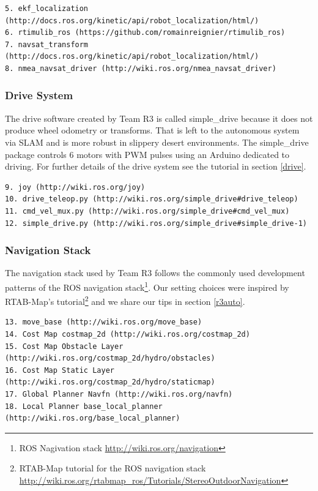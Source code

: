 \documentclass[runningheads,a4paper]{llncs}
\begin{document}
\begin{lstlisting}[frame=single,caption={Odometry software components used in Team R3's rover (numbers refer to Fig. \ref{fig:Diagram}).},basicstyle=\sffamily\scriptsize]
5. ekf_localization (http://docs.ros.org/kinetic/api/robot_localization/html/)
6. rtimulib_ros (https://github.com/romainreignier/rtimulib_ros)
7. navsat_transform (http://docs.ros.org/kinetic/api/robot_localization/html/)
8. nmea_navsat_driver (http://wiki.ros.org/nmea_navsat_driver)
\end{lstlisting}


\subsubsection*{Drive System}
The drive software created by Team R3 is called simple\_drive because it does not produce wheel odometry or transforms. That is left to the autonomous system via SLAM and is more robust in slippery desert environments. The simple\_drive package controls 6 motors with PWM pulses using an Arduino dedicated to driving. For further details of the drive system see the tutorial in section \ref{drive}.

\begin{lstlisting}[frame=single,caption={Drive system software used in Team R3's rover (numbers refer to Fig. \ref{fig:Diagram}).},basicstyle=\sffamily\scriptsize]
9. joy (http://wiki.ros.org/joy)
10. drive_teleop.py (http://wiki.ros.org/simple_drive#drive_teleop)
11. cmd_vel_mux.py (http://wiki.ros.org/simple_drive#cmd_vel_mux)
12. simple_drive.py (http://wiki.ros.org/simple_drive#simple_drive-1)
\end{lstlisting}

\subsubsection*{Navigation Stack}
The navigation stack used by Team R3 follows the commonly used development patterns of the ROS navigation stack\footnote{ROS Nagivation stack \url{http://wiki.ros.org/navigation}}. Our setting choices were inspired by RTAB-Map's tutorial\footnote{RTAB-Map tutorial for the ROS navigation stack \url{http://wiki.ros.org/rtabmap_ros/Tutorials/StereoOutdoorNavigation}} and we share our tips in section \ref{r3auto}.

\begin{lstlisting}[frame=single,caption={ Navigation software stack used in Team R3's rover (numbers refer to Fig. \ref{fig:Diagram}).},basicstyle=\sffamily\scriptsize]
13. move_base (http://wiki.ros.org/move_base)
14. Cost Map costmap_2d (http://wiki.ros.org/costmap_2d)
15. Cost Map Obstacle Layer (http://wiki.ros.org/costmap_2d/hydro/obstacles)
16. Cost Map Static Layer (http://wiki.ros.org/costmap_2d/hydro/staticmap)
17. Global Planner Navfn (http://wiki.ros.org/navfn)
18. Local Planner base_local_planner (http://wiki.ros.org/base_local_planner)
\end{lstlisting}
\end{document}
